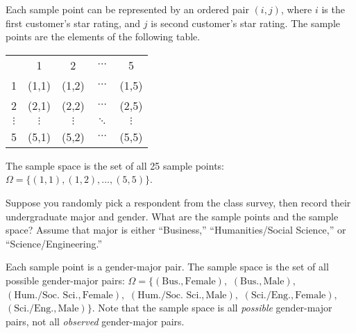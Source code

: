 \documentclass[11pt]{exam}
\begin{document}
\begin{questions}
\begin{solution}
Each sample point can be represented by an ordered pair $(i,j)$, where $i$ is
the first customer's star rating, and $j$ is second customer's star rating.  The
sample points are the elements of the following table.
\begin{center}
\begin{tabular}{c|c|c|c|c|}
\multicolumn{1}{c}{} &
\multicolumn{1}{c}{1} &
\multicolumn{1}{c}{2} &
\multicolumn{1}{c}{$\cdots$} &
\multicolumn{1}{c}{5} \\
\cline{2-5}
1 & (1,1) & (1,2) & $\cdots$ & (1,5) \\
\cline{2-5}
2 & (2,1) & (2,2) & $\cdots$ & (2,5) \\
\cline{2-5}
$\vdots$ & $\vdots$ & $\vdots$ & $\ddots$ & $\vdots$ \\
\cline{2-5}
5 & (5,1) & (5,2) & $\cdots$ & (5,5) \\
\cline{2-5}
\end{tabular}
\end{center}
The sample space is the set of all 25 sample points: $\Omega = \{ (1,1), (1,2),
\dotsc, (5,5) \}$.
\end{solution}



\newpage
\question Suppose you randomly pick a respondent from the class survey, then
record their undergraduate major and gender.  What are the sample points and the sample space?
Assume that major is either ``Business,'' ``Humanities/Social Science,'' or
``Science/Engineering.''

\begin{solution}
Each sample point is a gender-major pair.  The sample space is the set of all
possible gender-major pairs: $\Omega = \{ (\text{Bus.}, \text{Female}),$
$(\text{Bus.}, \text{Male}),$
$(\text{Hum./Soc.~Sci.}, \text{Female}),$
$(\text{Hum./Soc.~Sci.}, \text{Male}),$
$(\text{Sci./Eng.}, \text{Female}),$
$(\text{Sci./Eng.}, \text{Male}) \}$.
Note that the sample space is all \emph{possible} gender-major pairs, not all
\emph{observed} gender-major pairs.
\end{solution}






\end{questions}
\end{document}
